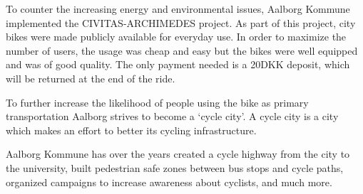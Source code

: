To counter the increasing energy and environmental issues, Aalborg Kommune implemented the CIVITAS-ARCHIMEDES project\cite{aalborgbycyklenbagcyklen}. As part of this project, city bikes were made publicly available for everyday use.
In order to maximize the number of users, the usage was cheap and easy but the bikes were well equipped and was of good quality\cite{cykelplanlaegning}. The only payment needed is a 20DKK deposit, which will be returned at the end of the ride.

To further increase the likelihood of people using the bike as primary transportation Aalborg strives to become a `cycle city'.
A cycle city is a city which makes an effort to better its cycling infrastructure.\cite{cykelhandlingsplan}

Aalborg Kommune has over the years 
created a cycle highway from the city to the university, \cite{cykelhandlingsplan}
built pedestrian safe zones between bus stops and cycle paths\cite{pedestriansafezone},
organized campaigns to increase awareness about cyclists\cite{cykelbycampaigns},
and much more.